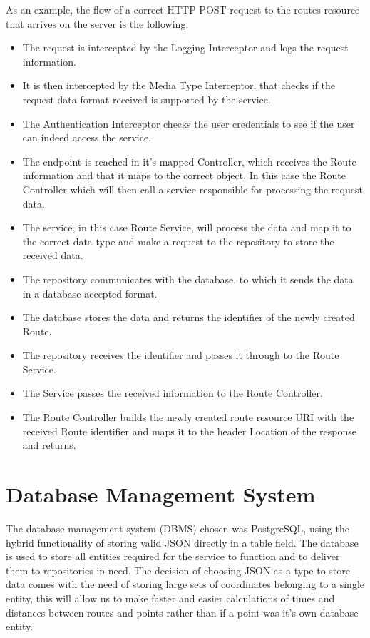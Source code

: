 As an example, the flow of a correct HTTP POST request to the routes resource that arrives on the server is the following:
    \begin{itemize}
        \item The request is intercepted by the Logging Interceptor and logs the request information.
        \item It is then intercepted by the Media Type Interceptor, that checks if the request data format 
        received is supported by the service.
        \item The Authentication Interceptor checks the user credentials to see if the user can indeed access the service.
        \item The endpoint is reached in it's mapped Controller, which receives the Route information and that it 
        maps to the correct object. In this case the Route Controller which will then call a service responsible 
        for processing the request data.
        \item The service, in this case Route Service, will process the data and map it  to the correct data type 
        and make a request to the repository to store the received data.
        \item The repository communicates with the database, to which it sends the data in a database accepted format.
        \item The database stores the data and returns the identifier of the newly created Route.
        \item The repository receives the identifier and passes it through to the Route Service.
        \item The Service passes the received information to the Route Controller.
        \item The Route Controller builds the newly created route resource URI with the received Route identifier 
        and maps it to the header Location of the response and returns.
    \end{itemize}
    \newpage

\section*{Database Management System}
The database management system \cite{dbmsdefinition} (DBMS) chosen was PostgreSQL\cite{postgresql}, using the hybrid functionality of storing valid JSON\cite{postgresqljson} directly in a table
field. The database is used to store all entities required for the service to function and to deliver them to repositories in need. 
The decision of choosing JSON as a type to store data comes with the need of storing large sets of coordinates 
belonging to a single entity, this will allow us to make faster and easier calculations of times and distances 
between routes and points rather than if a point was it's own database entity. 

